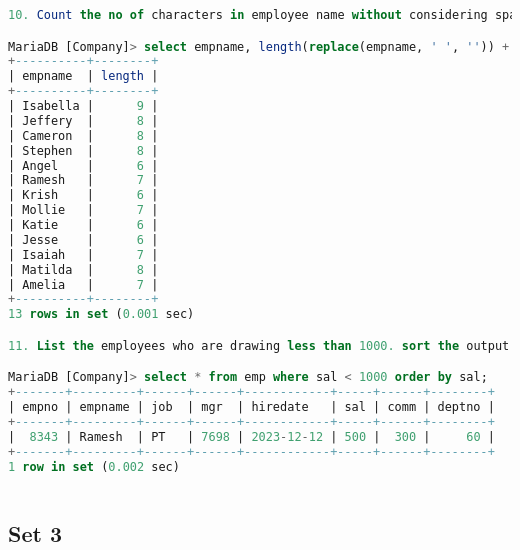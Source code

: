 \documentclass[11pt]{article}
\begin{document}
\begin{lstlisting}[language=SQL]
10. Count the no of characters in employee name without considering spaces for each name.

MariaDB [Company]> select empname, length(replace(empname, ' ', '')) + 1 as length from emp;
+----------+--------+
| empname  | length |
+----------+--------+
| Isabella |      9 |
| Jeffery  |      8 |
| Cameron  |      8 |
| Stephen  |      8 |
| Angel    |      6 |
| Ramesh   |      7 |
| Krish    |      6 |
| Mollie   |      7 |
| Katie    |      6 |
| Jesse    |      6 |
| Isaiah   |      7 |
| Matilda  |      8 |
| Amelia   |      7 |
+----------+--------+
13 rows in set (0.001 sec)

11. List the employees who are drawing less than 1000. sort the output by salary.

MariaDB [Company]> select * from emp where sal < 1000 order by sal;
+-------+---------+------+------+------------+-----+------+--------+
| empno | empname | job  | mgr  | hiredate   | sal | comm | deptno |
+-------+---------+------+------+------------+-----+------+--------+
|  8343 | Ramesh  | PT   | 7698 | 2023-12-12 | 500 |  300 |     60 |
+-------+---------+------+------+------------+-----+------+--------+
1 row in set (0.002 sec)
	
\end{lstlisting}

\subsection{Set 3}
\end{document}
